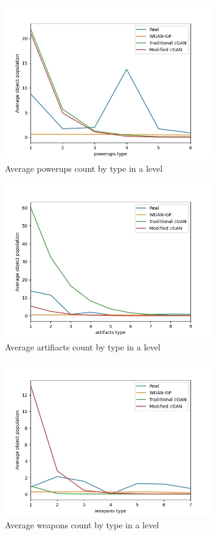 \documentclass{Configuration_Files/PoliMi3i_thesis}
\begin{document}
\begin{figure}[H]
    \centering
    \includegraphics[width=0.8\textwidth]{powerups_count.jpg}
    \caption{Average powerups count by type in a level}
    \label{fig:powerupscount}
\end{figure}
\begin{figure}[H]
    \centering
    \includegraphics[width=0.8\textwidth]{artifacts_count.jpg}
    \caption{Average artifiacts count by type in a level}
    \label{fig:artifactscount}
\end{figure}
\begin{figure}[H]
    \centering
    \includegraphics[width=0.8\textwidth]{weapons_count.jpg}
    \caption{Average weapons count by type in a level}
    \label{fig:weaponscount}
\end{figure}
\end{document}
